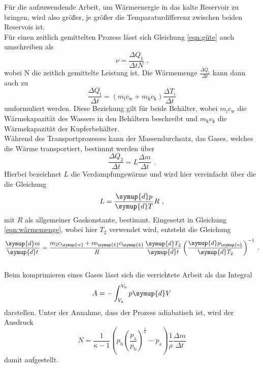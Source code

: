 Für die aufzuwendende Arbeit, um Wärmeenergie in das kalte Reservoir zu bringen, wird also größer, je größer die Temparaturdifferenz
zwischen beiden Reservois ist. \\
\noindent Für einen zeitlich gemittelten Prozess lässt sich Gleichung \ref{eqn:güte} auch umschreiben als
\begin{equation}
    \nu=\frac{\Delta Q_1}{\Delta tN} \text{ ,}
\end{equation}
wobei N die zeitlich gemittelte Leistung ist. Die Wärmemenge $\frac{\Delta Q_i}{\Delta t}$ kann dann auch zu
\begin{equation}
    \frac{\Delta Q_{\mathrm{i}}}{\Delta t}=(m_{\mathrm{i}}c_{\mathrm{w}}+m_{\mathrm{k}}c_{\mathrm{k}})\frac{\Delta T_i}{\Delta t}
    \label{eqn:wärmemenge}
\end{equation}
umformuliert werden. Diese Beziehung gilt für beide Behälter, wobei $m_{\mathrm{i}}c_{\mathrm{w}}$ die Wärmekapazität des Wassers
in den Behältern beschreibt und $m_{\mathrm{k}}c_{\mathrm{k}}$ die Wärmekapazität der Kupferbehälter.\\

\noindent Während des Transportprozesses kann der Massendurchsatz, das Gases, welches die Wärme transportiert, bestimmt werden
über
\begin{equation}
    \frac{\Delta Q_2}{\Delta t}=L\frac{\Delta m}{\Delta t} \text{ .}
\end{equation}
Hierbei bezeichnet $L$ die Verdampfungswärme und wird hier vereinfacht über die die Gleichung
\begin{equation}
    L=\frac{\symup{d}p}{\symup{d}T}R \text{ ,}
\end{equation}
mit $R$ als allgemeiner Gaskonstante, bestimmt. Eingesetzt in Gleichung \ref{eqn:wärmemenge}, wobei hier $T_2$ verwendet wird,
entsteht die Gleichung
\begin{equation}
    \frac{\symup{d}m}{\symup{d}t}=\frac{m_2c_{\symup{w}}+m_{\symup{k}}c_{\symup{k}}}{R}\frac{\symup{d}T_2}{\symup{d}t}\left(\frac{\symup{d}p_{\symup{a}}}{\symup{d}T_2}\right)^{-1} \text{ .}
\end{equation}
\\
\noindent Beim komprimieren eines Gases lässt sich die verrichtete Arbeit als das Integral
\begin{equation}
    A=-\int_{V_{\mathrm{a}}}^{V_{\mathrm{b}}}p \symup{d}V
\end{equation}
darstellen. Unter der Annahme, dass der Prozess adiabatisch ist, wird der Ausdruck
\begin{equation}
    N=\frac{1}{\kappa -1}\left(p_{\mathrm{b}}\left(\frac{p_{\mathrm{a}}}{p_{\mathrm{b}}}\right)^{\frac{1}{\kappa}}-p_{\mathrm{a}}\right)\frac{1}{\rho}\frac{\Delta m}{\Delta t}
    \label{eqn:leistung}
\end{equation}
damit aufgestellt. 